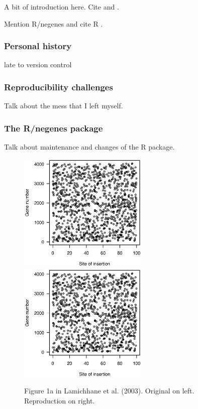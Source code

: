 \begin{quote}
\small
\articleABSTRACT
\end{quote}



A bit of introduction here. Cite \citet{lamichhane2003}
and \citet{blades2002}.

Mention R/negenes \citep{negenes} and cite R \citep{R}.

\subsubsection{Personal history}

late to version control

\subsubsection{Reproducibility challenges}

Talk about the mess that I left myself.

\subsubsection{The R/negenes package}

Talk about maintenance and changes of the R package.


\begin{figure}

\includegraphics[viewport=133 224 464 528, width=0.55\textwidth]{../original/Nov02/R/Figs/fig1.ps}
\hfill
\includegraphics[viewport=133 224 464 528, width=0.55\textwidth]{../reproduction/Figs/fig1.ps}

\caption{Figure 1a in Lamichhane et al. (2003). Original on left. Reproduction on right.}

\end{figure}

